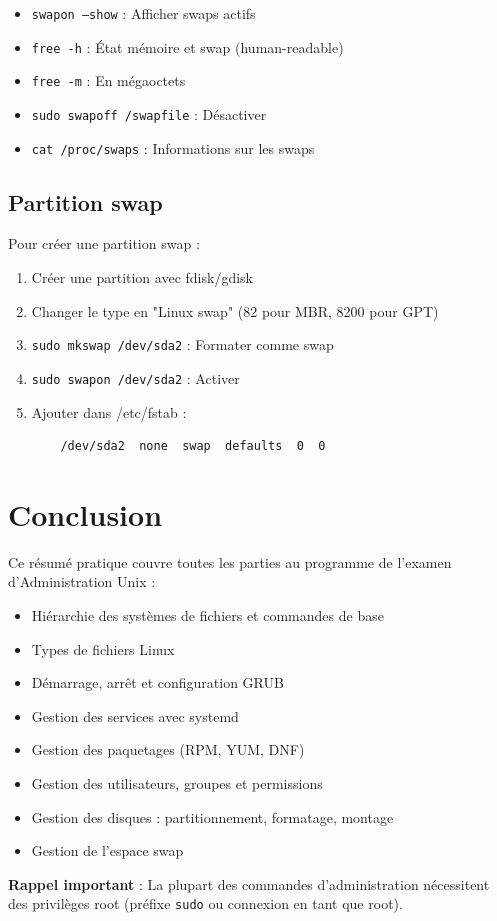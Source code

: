 \documentclass[12pt,a4paper]{article}
\begin{document}
\begin{itemize}
    \item \texttt{swapon --show} : Afficher swaps actifs
    \item \texttt{free -h} : État mémoire et swap (human-readable)
    \item \texttt{free -m} : En mégaoctets
    \item \texttt{sudo swapoff /swapfile} : Désactiver
    \item \texttt{cat /proc/swaps} : Informations sur les swaps
\end{itemize}

\subsection{Partition swap}

Pour créer une partition swap :
\begin{enumerate}
    \item Créer une partition avec fdisk/gdisk
    \item Changer le type en "Linux swap" (82 pour MBR, 8200 pour GPT)
    \item \texttt{sudo mkswap /dev/sda2} : Formater comme swap
    \item \texttt{sudo swapon /dev/sda2} : Activer
    \item Ajouter dans /etc/fstab :
    \begin{verbatim}
    /dev/sda2  none  swap  defaults  0  0
    \end{verbatim}
\end{enumerate}


\section*{Conclusion}

Ce résumé pratique couvre toutes les parties au programme de l'examen d'Administration Unix :
\begin{itemize}
    \item Hiérarchie des systèmes de fichiers et commandes de base
    \item Types de fichiers Linux
    \item Démarrage, arrêt et configuration GRUB
    \item Gestion des services avec systemd
    \item Gestion des paquetages (RPM, YUM, DNF)
    \item Gestion des utilisateurs, groupes et permissions
    \item Gestion des disques : partitionnement, formatage, montage
    \item Gestion de l'espace swap
\end{itemize}

\textbf{Rappel important} : La plupart des commandes d'administration nécessitent des privilèges root (préfixe \texttt{sudo} ou connexion en tant que root).
\end{document}
